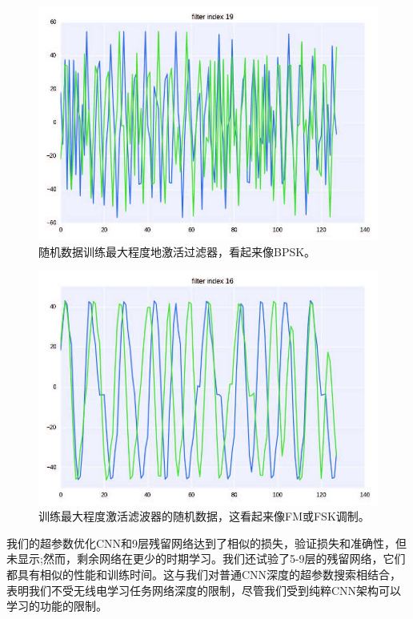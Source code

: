 \begin{figure}[!h]
	\centering
	\includegraphics[scale=1]{figures/chapter_5/fig9_b}
	\caption{随机数据训练最大程度地激活过滤器，看起来像BPSK。}
\end{figure}

\begin{figure}[!h]
	\centering
	\includegraphics[scale=1]{figures/chapter_5/fig10_b}
	\caption{训练最大程度激活滤波器的随机数据，这看起来像FM或FSK调制。}
\end{figure}


我们的超参数优化CNN和9层残留网络达到了相似的损失，验证损失和准确性，但未显示;然而，剩余网络在更少的时期学习。我们还试验了5-9层的残留网络，它们都具有相似的性能和训练时间。这与我们对普通CNN深度的超参数搜索相结合，表明我们不受无线电学习任务网络深度的限制，尽管我们受到纯粹CNN架构可以学习的功能的限制。\par

